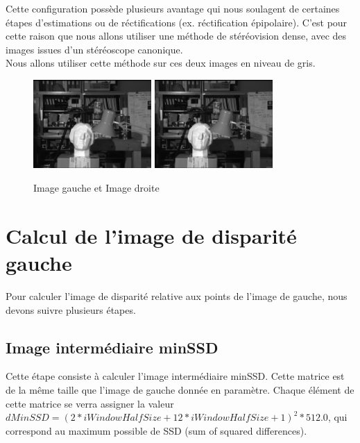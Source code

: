 \documentclass[a4paper]{article}
\begin{document}
Cette configuration possède plusieurs avantage qui nous soulagent de certaines étapes d'estimations ou de réctifications (ex. réctification épipolaire). C'est pour cette raison que nous allons utiliser une méthode de stéréovision dense, avec des images issues d'un stéréoscope canonique.\\

Nous allons utiliser cette méthode sur ces deux images en niveau de gris.
\begin{figure}[h]
\begin{center}
\includegraphics[width=170px]{left.png}
\includegraphics[width=170px]{right.png}
\end{center}
\caption{Image gauche et Image droite}
\end{figure}

\clearpage

\section{Calcul de l'image de disparité gauche}

Pour calculer l'image de disparité relative aux points de l'image de gauche, nous devons suivre plusieurs étapes.

\subsection{Image intermédiaire minSSD}

Cette étape consiste à calculer l'image intermédiaire minSSD. Cette matrice est de la même taille que l'image de gauche donnée en paramètre.
Chaque élément de cette matrice se verra assigner la valeur $dMinSSD = (2 * iWindowHalfSize + 12 * iWindowHalfSize + 1)^2 * 512.0$, qui correspond au maximum possible de SSD (sum of squared differences).
\end{document}
